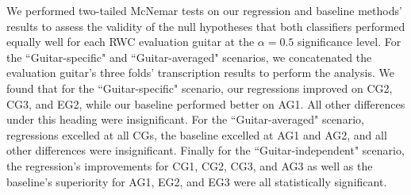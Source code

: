 \documentclass[12pt]{cmuthesis}
\begin{document}
We performed two-tailed McNemar tests on our regression and baseline methods' results to assess the validity of the null hypotheses that both classifiers performed equally well for each RWC evaluation guitar at the $\alpha = 0.5$ significance level. For the ``Guitar-specific" and ``Guitar-averaged" scenarios, we concatenated the evaluation guitar's three folds' transcription results to perform the analysis. We found that for the ``Guitar-specific" scenario, our regressions improved on CG2, CG3, and EG2, while our baseline performed better on AG1. All other differences under this heading were insignificant. For the ``Guitar-averaged" scenario, regressions excelled at all CGs, the baseline excelled at AG1 and AG2, and all other differences were insignificant. Finally for the ``Guitar-independent" scenario, the regression's improvements for CG1, CG2, CG3, and AG3 as well as the baseline's superiority for AG1, EG2, and EG3 were all statistically significant. 
\end{document}
